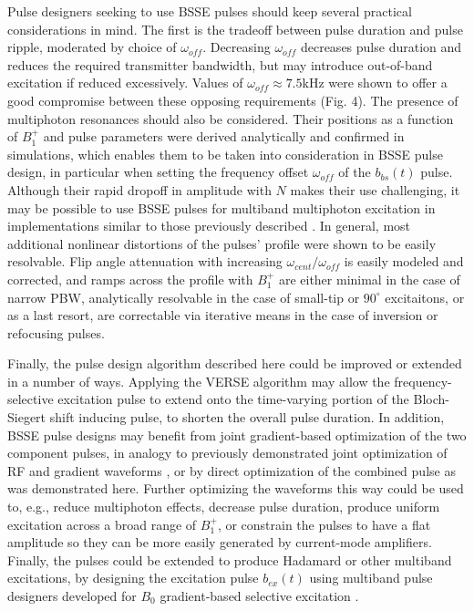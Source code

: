 \documentclass{article}
\newcommand{\bbst}{b_{bs}(t)}
\begin{document}
\par Pulse designers seeking to use BSSE pulses should keep several practical considerations in mind. The first is the tradeoff between pulse duration and pulse ripple, moderated by choice of $\omega_{off}$. Decreasing $\omega_{off}$ decreases pulse duration and reduces the required transmitter bandwidth, but may introduce out-of-band excitation if reduced excessively. Values of $\omega_{off} \approx 7.5$kHz were shown to offer a good compromise between these opposing requirements (Fig. 4). The presence of multiphoton resonances should also be considered. Their positions as a function of $B_1^+$ and pulse parameters were derived analytically
and confirmed in simulations, which enables them to be taken into consideration in BSSE pulse design,
in particular when setting the frequency offset $\omega_{off}$ of the $\bbst$ pulse. 
Although their rapid dropoff in amplitude with $N$ makes their use challenging, 
it may be possible to use BSSE pulses for multiband multiphoton excitation in implementations similar to those previously described \cite{Han2020MultiphotonImplementation}. In general, most additional nonlinear distortions of the pulses' profile were shown to be easily resolvable. Flip angle attenuation with increasing $\omega_{cent}/\omega_{off}$ is easily modeled and corrected, and ramps across the profile with $B_1^+$ are either minimal in the case of narrow PBW, analytically resolvable in the case of small-tip or $90^\circ$ excitaitons, or as a last resort, are correctable via iterative means in the case of inversion or refocusing pulses.

\par Finally, the pulse design algorithm described here could be improved or extended in a number of ways. 
Applying the VERSE algorithm \cite{Hargreaves2004Variable-rateSequences} may allow the frequency-selective excitation pulse to extend onto the time-varying portion of the Bloch-Siegert shift inducing pulse, 
to shorten the overall pulse duration. 
In addition, BSSE pulse designs may benefit from joint gradient-based optimization of the two component pulses, 
in analogy to previously demonstrated joint optimization of RF and gradient waveforms \cite{Luo2020JointMRI}, 
or by direct optimization of the combined pulse as was demonstrated here.
Further optimizing the waveforms this way could be used to, e.g., 
reduce multiphoton effects, decrease pulse duration, produce uniform excitation across a broad range of $B_1^+$,
or constrain the pulses to have a flat amplitude so they can be more easily generated by 
current-mode amplifiers. %
Finally, the pulses could be extended to produce Hadamard or other multiband excitations,
by designing the excitation pulse $b_{ex}(t)$ using multiband pulse designers developed
for $B_0$ gradient-based selective excitation \cite{ Cunningham1999MethodTransform, Sharma2016Root-flippedPulses, Ma2017MinimumImaging}.
\end{document}
